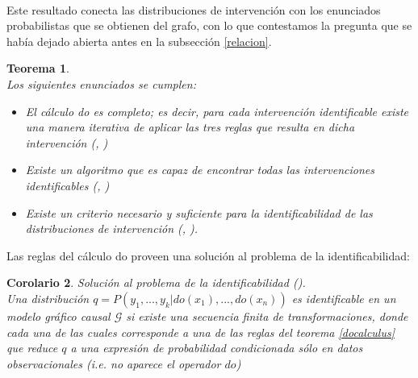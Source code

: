 \documentclass[11pt]{article}
\theoremstyle{plain}
\newtheorem{teo}{Teorema}
\newtheorem{cor}[teo]{Corolario}
\begin{document}
\\
Este resultado conecta las distribuciones de intervención con los enunciados probabilistas que se obtienen del grafo, con lo que contestamos la pregunta que se había dejado abierta antes en la subsección \ref{relacion}.
\begin{teo}{\cite{peters2017elements}}\\
Los siguientes enunciados se cumplen:
\begin{itemize}
\item El cálculo do es completo; es decir, para cada intervención identificable existe una manera iterativa de aplicar las tres reglas que resulta en dicha intervención (\cite{huang2006pearl}, \cite{shpitser2006identification})
\item Existe un algoritmo que es capaz de encontrar todas las intervenciones identificables (\cite{tian2002}, \cite{huang2006pearl})
\item Existe un criterio necesario y suficiente para la identificabilidad de las distribuciones de intervención (\cite{shpitser2006identification}, \cite{huang2006pearl}).
\end{itemize}
\end{teo}
Las reglas del cálculo do proveen una solución al problema de la identificabilidad:
\begin{cor} Solución al problema de la identificabilidad (\cite{pearl2009causality}).\\
Una distribución $q=P(y_1,...,y_k | do(x_1),...,do(x_n))$ es identificable en un modelo gráfico causal $\mathcal{G}$ si existe una secuencia finita de transformaciones, donde cada una de las cuales corresponde a una de las reglas del teorema \ref{docalculus} que reduce $q$ a una expresión de probabilidad condicionada sólo en datos observacionales (i.e. no aparece el operador $do$)
\end{cor}
\end{document}
